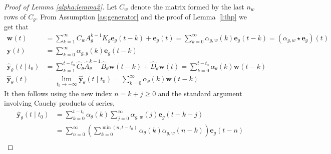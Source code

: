 \documentclass{article}
\newcommand{\e}{\mathbf{e}}
\newcommand{\y}{\mathbf{y}}
\newcommand{\w}{\mathbf{w}}
\begin{document}
\begin{proof}[Proof of Lemma  \ref{alpha:lemma2}]
  Let $C_w$ denote the matrix formed by the last $n_w$ rows of $C_g$. From Assumption \ref{as:generator} and the proof of Lemma~\ref{l:ihp} we get that
  \begin{align*}
  \w(t)&=\sum_{k=1}^{\infty} C_w A_g^{k-1} K_g \e_g(t-k)+ \e_g(t)=\sum_{k=0}^{\infty} \alpha_{g,w}(k)\e_g(t-k)
  =(\alpha_{g,w}\star\e_g)(t)\\
  \y(t)&=\sum_{k=0}^{\infty} \alpha_{g,y}(k)\e_g(t-k)\\
  \hat{\y}_{\theta}(t \mid t_0)&=\sum_{k=1}^{t-t_0} \hat{C}_{\theta}\hat{A}_{\theta}^{k-1}\hat{B}_{\theta}\w(t-k)+\hat{D}_{\theta}\w(t)=\sum_{k=0}^{t-t_0} \alpha_{\theta}(k)\w(t-k)\\ 
  \hat{\y}_{\theta}(t)&=\lim_{t_0 \rightarrow -\infty} \hat{\y}_{\theta}(t \mid t_0)=\sum_{k=0}^{\infty} \alpha_{\theta}(k)\w(t-k) 
  \end{align*}
  It then follows using the new index $n=k+j\geq 0$ and the standard argument involving Cauchy products of series, 
  \begin{align*}
     \hat{\y}_{\theta}(t \mid t_0)
     &=\sum_{k=0}^{t-t_0} \alpha_{\theta}(k)\sum_{j=0}^{\infty} \alpha_{g,w}(j)\e_g(t-k-j)\\
      &= \sum_{n=0}^{\infty } \left(\sum_{k=0}^{\min(n,t-t_0)} \alpha_{\theta}(k)\alpha_{g,w}(n-k)\right)\e_g(t-n)\\

\end{align*}
\end{proof}
\end{document}
